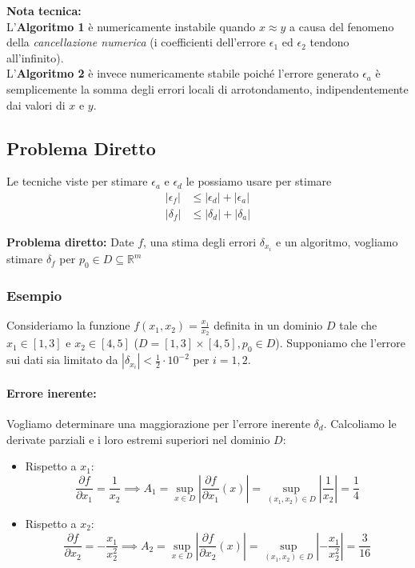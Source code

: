 \documentclass[a4paper,12pt]{article}
\begin{document}
	\vspace{1cm}
	
	\noindent
	\textbf{Nota tecnica:} \\
	L'\textbf{Algoritmo 1} è numericamente instabile quando $x \approx y$ a causa del fenomeno della \textit{cancellazione numerica} (i coefficienti dell'errore $\epsilon_1$ ed $\epsilon_2$ tendono all'infinito). \\
	L'\textbf{Algoritmo 2} è invece numericamente stabile poiché l'errore generato $\epsilon_a$ è semplicemente la somma degli errori locali di arrotondamento, indipendentemente dai valori di $x$ e $y$.
	\subsection{Problema Diretto}
	Le tecniche viste per stimare $\epsilon_a$ e $\epsilon_d$ le possiamo usare per stimare
	\begin{align*}
		|\epsilon_f| &\leq |\epsilon_d| + |\epsilon_a| \\
		|\delta_f| &\leq |\delta_d| + |\delta_a|
	\end{align*}
	\begin{tcolorbox}[colback=yellow!10!white, colframe=yellow!50!black]
		\textbf{Problema diretto:} Date $f$, una stima degli errori $\delta_{x_i}$ e un algoritmo, vogliamo stimare $\delta_f$ per $p_0 \in D \subseteq \mathbb{R}^m$
	\end{tcolorbox}
	
	\subsubsection*{Esempio} Consideriamo la funzione $f(x_1, x_2) = \frac{x_1}{x_2}$ definita in un dominio $D$ tale che $x_1 \in [1, 3]$ e $x_2 \in [4, 5]$ ($D = [1,3] \times [4,5], p_0 \in D$). Supponiamo che l'errore sui dati sia limitato da $|\delta_{x_i}| < \frac{1}{2} \cdot 10^{-2}$ per $i = 1, 2$.
	
	\paragraph{Errore inerente:}
	Vogliamo determinare una maggiorazione per l'errore inerente $\delta_d$. Calcoliamo le derivate parziali e i loro estremi superiori nel dominio $D$:
	
	\begin{itemize}
		\item Rispetto a $x_1$: 
		\[ \frac{\partial f}{\partial x_1} = \frac{1}{x_2} \implies A_1 = \sup_{x \in D} \left| \frac{\partial f}{\partial x_1}(x) \right| = \sup_{(x_1,x_2) \in D} \left| \frac{1}{x_2} \right| = \frac{1}{4} \]
		
		\item Rispetto a $x_2$: 
		\[ \frac{\partial f}{\partial x_2} = -\frac{x_1}{x_2^2} \implies A_2 = \sup_{x \in D} \left| \frac{\partial f}{\partial x_2}(x) \right| = \sup_{(x_1,x_2) \in D} \left| -\frac{x_1}{x_2^2} \right| = \frac{3}{16} \]
	\end{itemize}
	
\end{document}
